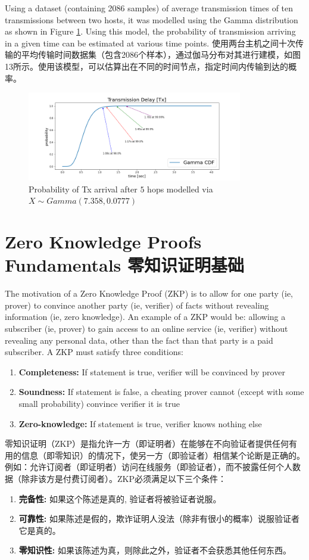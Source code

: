 \documentclass{ctexart}
\begin{document}
Using a dataset (containing 2086 samples) of average transmission times of ten transmissions between two hosts, it was modelled using the Gamma distribution as shown in Figure \ref{fig:tx_delay}. Using this model, the probability of transmission arriving in a given time can be estimated at various time points. 使用两台主机之间十次传输的平均传输时间数据集（包含2086个样本），通过伽马分布对其进行建模，如图13所示。使用该模型，可以估算出在不同的时间节点，指定时间内传输到达的概率。

\begin{figure}[h!]
\centering
\includegraphics[width=3.7in]{img/transmission_delay.png}
\caption{Probability of Tx arrival after $5$ hops modelled via $X \sim Gamma(7.358,0.0777)$} 
\label{fig:tx_delay}
\end{figure} 

\section{Zero Knowledge Proofs Fundamentals 零知识证明基础}

The motivation of a Zero Knowledge Proof (ZKP) is to allow for one party (ie, prover) to convince another party (ie, verifier) of facts without revealing information (ie, zero knowledge). An example of a ZKP would be: allowing a subscriber (ie, prover) to gain access to an online service (ie, verifier) without revealing any personal data, other than the fact than that party is a paid subscriber. A ZKP must satisfy three conditions:
\begin{enumerate}
\item \textbf{Completeness:} If statement is true, verifier will be convinced by prover
\item\textbf{Soundness:} If statement is false, a cheating prover cannot (except with some small probability) convince verifier it is true
\item \textbf{Zero-knowledge:} If statement is true, verifier knows nothing else
\end{enumerate}

零知识证明（ZKP）是指允许一方（即证明者）在能够在不向验证者提供任何有用的信息（即零知识）的情况下，使另一方（即验证者）相信某个论断是正确的。例如：允许订阅者（即证明者）访问在线服务（即验证者），而不披露任何个人数据（除非该方是付费订阅者）。ZKP必须满足以下三个条件：
\begin{enumerate}
\item \textbf{完备性:} 如果这个陈述是真的, 验证者将被验证者说服。
\item\textbf{可靠性:} 如果陈述是假的，欺诈证明人没法（除非有很小的概率）说服验证者它是真的。
\item \textbf{零知识性:} 如果该陈述为真，则除此之外，验证者不会获悉其他任何东西。
\end{enumerate}
\end{document}
